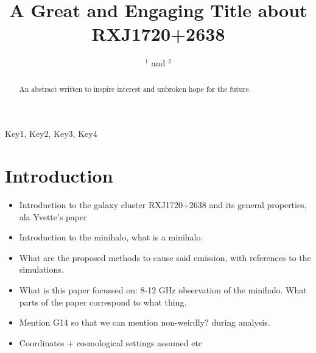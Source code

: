 \documentclass{pas}
\begin{document}



\title{A Great and Engaging Title about RXJ1720+2638}

\author{ $^{1}$ and  $^{2}$}





\begin{abstract}
An abstract written to inspire interest and unbroken hope for the future.
\end{abstract}

\begin{keywords}
Key1, Key2, Key3, Key4
\end{keywords}

\maketitle

\section{Introduction}

\begin{itemize}
  \item Introduction to the galaxy cluster RXJ1720+2638 and its general properties, ala Yvette's paper
  \item Introduction to the minihalo, what is a minihalo.
  \item What are the proposed methods to cause said emission, with references to the simulations.
  \item What is this paper focussed on: 8-12 GHz observation of the minihalo. What parts of the paper correspond to what thing.
  \item Mention G14 so that we can mention non-weirdly? during analysis.
  \item Coordinates + cosmological settings assumed etc
\end{itemize}
\end{document}
